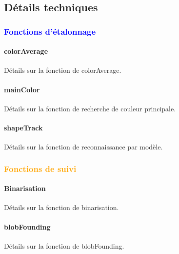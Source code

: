 \documentclass{report}
\begin{document}
				\subsection{Détails techniques}
					\subsubsection{\textcolor{blue}{Fonctions d'étalonnage}}
						\paragraph{colorAverage} \paragraph{}
						Détails sur la fonction de colorAverage.
						\paragraph{mainColor} \paragraph{}
						Détails sur la fonction de recherche de couleur principale.
						\paragraph{shapeTrack} \paragraph{}
						Détails sur la fonction de reconnaissance par modèle.
					\subsubsection{\textcolor{orange}{Fonctions de suivi}}
						\paragraph{Binarisation} \paragraph{}
							Détails sur la fonction de binarisation.
						\paragraph{blobFounding} \paragraph{}
						Détails sur la fonction de blobFounding.
\end{document}

